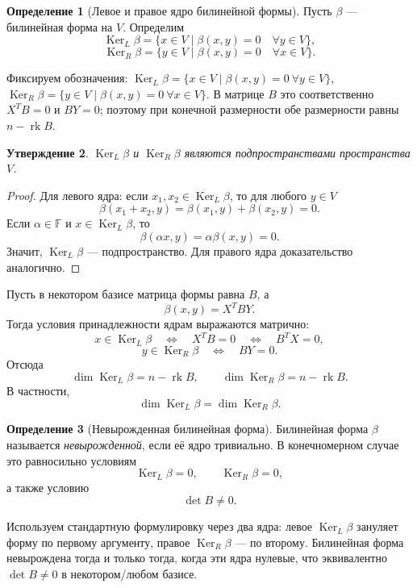 \documentclass[12pt,a4paper]{article}
\theoremstyle{definition}
\newtheorem{definition}{Определение}[section]
\theoremstyle{plain}
\newtheorem{proposition}[definition]{Утверждение}
\theoremstyle{remark}
\newenvironment{knowledgefix}{\begin{clarifybox}}{\end{clarifybox}}
\newcommand{\F}{\mathbb{F}}
\newcommand{\Ker}{\operatorname{Ker}}
\newcommand{\rk}{\operatorname{rk}}
\begin{document}
\begin{definition}[Левое и правое ядро билинейной формы]
Пусть $\beta$ --- билинейная форма на $V$.
Определим
\[
    \Ker_L\beta=\{x\in V\mid \beta(x,y)=0\quad \forall y\in V\},
\]
\[
    \Ker_R\beta=\{y\in V\mid \beta(x,y)=0\quad \forall x\in V\}.
\]
\begin{knowledgefix}
Фиксируем обозначения: \(\Ker_L\beta=\{x\in V\mid \beta(x,y)=0\ \forall y\in V\}\), \(\Ker_R\beta=\{y\in V\mid \beta(x,y)=0\ \forall x\in V\}\). В матрице \(B\) это соответственно \(X^TB=0\) и \(BY=0\); поэтому при конечной размерности обе размерности равны \(n-\rk B\).
\end{knowledgefix}
\end{definition}

\begin{proposition}
$\Ker_L\beta$ и $\Ker_R\beta$ являются подпространствами пространства $V$.
\end{proposition}

\begin{proof}
Для левого ядра:
если $x_1,x_2\in\Ker_L\beta$, то для любого $y\in V$
\[
    \beta(x_1+x_2,y)=\beta(x_1,y)+\beta(x_2,y)=0.
\]
Если $\alpha\in\F$ и $x\in\Ker_L\beta$, то
\[
    \beta(\alpha x,y)=\alpha\beta(x,y)=0.
\]
Значит, $\Ker_L\beta$ --- подпространство. Для правого ядра доказательство аналогично.
\end{proof}

Пусть в некотором базисе матрица формы равна $B$, а
\[
    \beta(x,y)=X^TBY.
\]
Тогда условия принадлежности ядрам выражаются матрично:
\[
    x\in\Ker_L\beta
    \quad\Longleftrightarrow\quad
    X^TB=0
    \quad\Longleftrightarrow\quad
    B^TX=0,
\]
\[
    y\in\Ker_R\beta
    \quad\Longleftrightarrow\quad
    BY=0.
\]
Отсюда
\[
    \dim \Ker_L\beta=n-\rk B,
    \qquad
    \dim \Ker_R\beta=n-\rk B.
\]
В частности,
\[
    \dim \Ker_L\beta=\dim \Ker_R\beta.
\]

\begin{definition}[Невырожденная билинейная форма]
Билинейная форма $\beta$ называется \emph{невырожденной}, если её ядро тривиально.
В конечномерном случае это равносильно условиям
\[
    \Ker_L\beta=0,
    \qquad
    \Ker_R\beta=0,
\]
а также условию
\[
    \det B\ne 0.
\]
\begin{knowledgefix}
Используем стандартную формулировку через два ядра: левое \(\Ker_L\beta\) зануляет форму по первому аргументу, правое \(\Ker_R\beta\) — по второму. Билинейная форма невырождена тогда и только тогда, когда эти ядра нулевые, что эквивалентно \(\det B\ne0\) в некотором/любом базисе.
\end{knowledgefix}
\end{definition}
\end{document}
